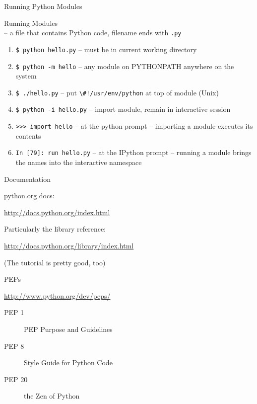 \documentclass{beamer}
\begin{document}
\begin{frame}[fragile]{Running Python Modules}


{\Large Running Modules}\\[0.05in]
-- a file that contains Python code, filename ends with \verb+.py+

 \begin{enumerate}
    \item \verb+$ python hello.py+  -- must be in current working directory

    \item \verb+$ python -m hello+  -- any module on PYTHONPATH anywhere on the system

    \item \verb+$ ./hello.py+       -- put \verb+\#!/usr/env/python+ at top of module (Unix)
   
    \item \verb+$ python -i hello.py+  -- import module, remain in interactive session 

    \item \verb+>>> import hello+    -- at the python prompt -- importing a module executes its contents

    \item \verb+In [79]: run hello.py+    -- at the IPython prompt -- running a module brings the names into the interactive namespace
\end{enumerate}

\end{frame} 

\begin{frame}[fragile]{Documentation}

{\Large python.org docs:}

\url{http://docs.python.org/index.html}

\vspace{0.25in}
{\Large Particularly the library reference:}

\url{http://docs.python.org/library/index.html}

\vspace{0.25in}
(The tutorial is pretty good, too)

\end{frame} 

\begin{frame}[fragile]{PEPs}

{\large \url{http://www.python.org/dev/peps/} }

\vspace{0.25in}
\begin{description}
  \item[PEP 1]   PEP Purpose and Guidelines
  \item[PEP 8]   Style Guide for Python Code
  \item[PEP 20]  the Zen of Python
\end{description}

\end{frame} 
\end{document}
